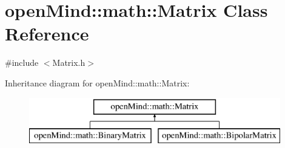 \hypertarget{classopen_mind_1_1math_1_1_matrix}{\section{open\+Mind\+:\+:math\+:\+:Matrix Class Reference}
\label{classopen_mind_1_1math_1_1_matrix}
}


{\ttfamily \#include $<$Matrix.\+h$>$}

Inheritance diagram for open\+Mind\+:\+:math\+:\+:Matrix\+:\begin{figure}[H]
\begin{center}
\leavevmode
\includegraphics[height=2.000000cm]{classopen_mind_1_1math_1_1_matrix}
\end{center}
\end{figure}
